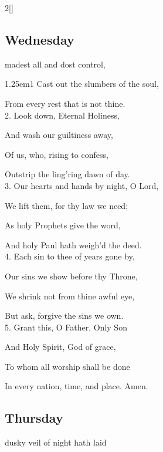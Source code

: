 \begin{paracol}{2}[]
\sloppy

\subsection{Wednesday}\label{WednesdayInvitatory}

 madest all and dost control,


\begin{hangparas}{1.25em}{1}
Cast out the slumbers of the soul,

From every rest that is not thine.\\

2. Look down, Eternal Holiness,

And wash our guiltiness away,

Of us, who, rising to confess,

Outstrip the ling'ring dawn of day.\\

3. Our hearts and hands by night, O Lord,

We lift them, for thy law we need;

As holy Prophets give the word,

And holy Paul hath weigh'd the deed.\\

4. Each sin to thee of years gone by,

Our sins we show before thy Throne,

We shrink not from thine awful eye,

But ask, forgive the sins we own.\\

5. Grant this, O Father, Only Son

And Holy Spirit, God of grace,

To whom all worship shall be done

In every nation, time, and place. Amen.
\end{hangparas}

\switchcolumn


\subsection{Thursday}\label{ThursdayInvitatory}

 dusky veil of night hath laid



\end{paracol}
